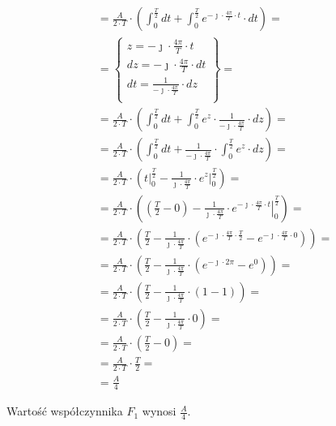 \begin{task}
\begin{align*}
&=\frac{A}{2\cdot T}\cdot \left( \int_{0}^{\frac{T}{2}} dt + \int_{0}^{\frac{T}{2}} e^{-\jmath \cdot \frac{4\pi}{T} \cdot t } \cdot dt \right)=\\
&=\begin{Bmatrix}
z=-\jmath \cdot \frac{4\pi}{T} \cdot t \\
dz=-\jmath \cdot \frac{4\pi}{T} \cdot dt \\
dt=\frac{1}{-\jmath \cdot \frac{4\pi}{T}} \cdot dz \\
\end{Bmatrix}=\\
&=\frac{A}{2\cdot T}\cdot \left( \int_{0}^{\frac{T}{2}} dt + \int_{0}^{\frac{T}{2}} e^{z } \cdot \frac{1}{-\jmath \cdot \frac{4\pi}{T}}\cdot dz \right)=\\
&=\frac{A}{2\cdot T}\cdot \left( \int_{0}^{\frac{T}{2}} dt + \frac{1}{-\jmath \cdot \frac{4\pi}{T}}\cdot \int_{0}^{\frac{T}{2}} e^{z} \cdot dz \right)=\\
&=\frac{A}{2\cdot T}\cdot \left( \left. t \right|_{0}^{\frac{T}{2}} - \frac{1}{\jmath \cdot \frac{4\pi}{T}}\cdot \left. e^{z} \right|_{0}^{\frac{T}{2}} \right)=\\
&=\frac{A}{2\cdot T}\cdot \left( \left( \frac{T}{2} - 0 \right) - \frac{1}{\jmath \cdot \frac{4\pi}{T}}\cdot \left. e^{-\jmath \cdot \frac{4\pi}{T} \cdot t} \right|_{0}^{\frac{T}{2}} \right)=\\
&=\frac{A}{2\cdot T}\cdot \left( \frac{T}{2} - \frac{1}{\jmath \cdot \frac{4\pi}{T}}\cdot \left(e^{-\jmath \cdot \frac{4\pi}{T} \cdot \frac{T}{2}}  - e^{-\jmath \cdot \frac{4\pi}{T} \cdot 0}\right) \right)=\\
&=\frac{A}{2\cdot T}\cdot \left( \frac{T}{2} - \frac{1}{\jmath \cdot \frac{4\pi}{T}}\cdot \left(e^{-\jmath \cdot 2\pi}  - e^{0}\right) \right)=\\
&=\frac{A}{2\cdot T}\cdot \left( \frac{T}{2} - \frac{1}{\jmath \cdot \frac{4\pi}{T}}\cdot \left(1  - 1\right) \right)=\\
&=\frac{A}{2\cdot T}\cdot \left( \frac{T}{2} - \frac{1}{\jmath \cdot \frac{4\pi}{T}}\cdot 0 \right)=\\
&=\frac{A}{2\cdot T}\cdot \left( \frac{T}{2} - 0 \right)=\\
&=\frac{A}{2\cdot T}\cdot \frac{T}{2}=\\
&=\frac{A}{4}
\end{align*}

Wartość współczynnika $F_1$ wynosi $\frac{A}{4}$.


\end{task}
